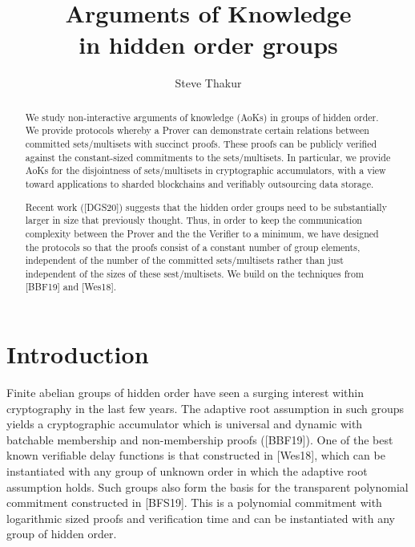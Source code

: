\documentclass[11pt, lettersize, notitlepage, leqno, footskip=0.6cm]{article}
\numberwithin{equation}{section}
\begin{document}
 
\title{Arguments of Knowledge\\ in hidden order groups}
\author{Steve Thakur}
\affil{}
\date{\vspace{-6ex}}
 
\maketitle

\begin{abstract} We study non-interactive arguments of knowledge (AoKs) in groups of hidden order. We provide protocols whereby a Prover can demonstrate certain relations between committed sets/multisets with succinct proofs. These proofs can be publicly verified against the constant-sized commitments to the sets/multisets. In particular, we provide AoKs for the disjointness of sets/multisets in cryptographic accumulators, with a view toward applications to sharded blockchains and verifiably outsourcing data storage. 

Recent work ([DGS20]) suggests that the hidden order groups need to be substantially larger in size that previously thought. Thus, in order to keep the communication complexity between the Prover and the the Verifier to a minimum, we have designed the protocols so that the proofs consist of a constant number of group elements, independent of the number of the committed sets/multisets rather than just independent of the sizes of these sest/multisets. We build on the techniques from [BBF19] and [Wes18].\end{abstract}

\section{\fontsize{12}{12}\selectfont Introduction  }


Finite abelian groups of hidden order have seen a surging interest within cryptography in the last few years. The adaptive root assumption in such groups yields a cryptographic accumulator which is universal and dynamic with batchable membership and non-membership proofs ([BBF19]). One of the best known verifiable delay functions is that constructed in [Wes18], which can be instantiated with any group of unknown order in which the adaptive root assumption holds. Such groups also form the basis for the transparent polynomial commitment constructed in [BFS19]. This is a polynomial commitment with logarithmic sized proofs and verification time and can be instantiated with any group of hidden order.
\end{document}
